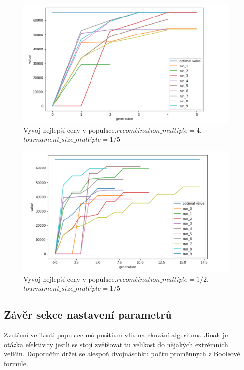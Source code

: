 \documentclass{article}
\begin{document}
\begin{figure}[H]
    \centering
    \includegraphics[width=1\textwidth]{screenshot_1291}
    \caption{Vývoj nejlepší ceny v populace.\newline \(recombination\_multiple=4\),\(tournament\_size\_multiple=1/5\)}
    \label{fig:se_415}
\end{figure}

\begin{figure}[H]
    \centering
    \includegraphics[width=1\textwidth]{screenshot_1292}
    \caption{Vývoj nejlepší ceny v populace.\newline \(recombination\_multiple=1/2\),\(tournament\_size\_multiple=1/5\)}
    \label{fig:se_1215}
\end{figure}

\subsection{Závěr sekce nastavení parametrů}
Zvetšení velikosti populace má positivní vliv na chování algoritmu. Jinak je otázka efektivity jestli se stojí zvětšovat tu velikost do nějakých extrémních veličin. Doporučím držet se alespoň dvojnásobku počtu proměnných z Booleově formule.
\end{document}
